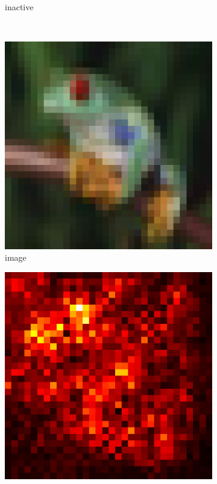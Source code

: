 \documentclass[preprint,12pt]{elsarticle}
\begin{document}
\begin{figure}
\begin{subfigure}{0.14\textwidth}
        \caption{inactive}
    \end{subfigure}\\
    \begin{subfigure}{0.14\linewidth}
        \centering
        \includegraphics[width=\linewidth]{../visualizations/examples/cifar10/resnet18/images/6.png}
        \caption{image}
    \end{subfigure}
    \hfill
    \begin{subfigure}{0.14\linewidth}
        \centering
        \includegraphics[width=\linewidth]{../visualizations/examples/cifar10/resnet18/saliency_map/6.png}

\end{subfigure}
\end{figure}
\end{document}
